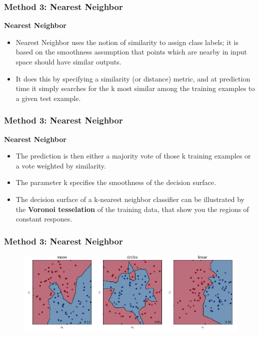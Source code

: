 \documentclass[MASTER.tex]{subfiles}
\begin{document}
\begin{frame}
	\frametitle{Method 3: Nearest Neighbor}
\Large
\textbf{Nearest Neighbor}
\begin{itemize}
\item Nearest Neighbor uses the notion of similarity to assign class labels; it is based on the smoothness assumption that points which are nearby in input space should have similar outputs.
\item  It does this by specifying a similarity (or distance) metric, and at prediction time it simply searches for the k most similar among the training examples to a given test example.
\end{itemize}
\end{frame}

\begin{frame}
		\frametitle{Method 3: Nearest Neighbor}
	\Large
	\textbf{Nearest Neighbor}
	\begin{itemize} 
		\item The prediction is then either a majority vote of those k training examples or a vote weighted by similarity. \item The parameter k specifies the smoothness of the decision surface.\item  The decision surface of a k-nearest neighbor classifier can be illustrated by the \textbf{Voronoi tesselation} of the training data, that show you the regions of constant respones.
\end{itemize}
\end{frame}
\begin{frame}
		\frametitle{Method 3: Nearest Neighbor}
	\begin{figure}
		\centering
		\includegraphics[width=1.1\linewidth]{sklcass/sklclass16}
	
	\end{figure}
	
\end{frame}
\end{document}
